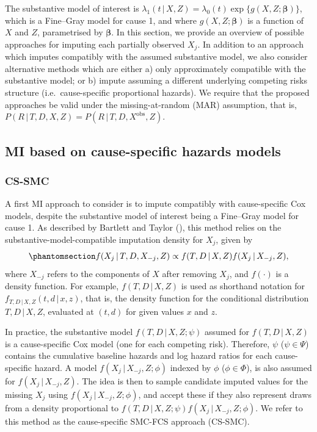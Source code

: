 \documentclass[
  letterpaper,
  paper=240mm:170mm,
  twoside=true,
  open=right,
  fontsize=10pt,
  pagesize=false,
  BCOR=15mm,
  DIV=14,
  headinclude=true,
  footinclude=false,
  headsepline=on]{scrbook}
\newcommand{\given}{\,|\,}
\begin{document}
The substantive model of interest is
\(\lambda_1(t \given X, Z) = \lambda_{0}(t)\exp\{g(X,Z;\boldsymbol{\beta})\}\),
which is a Fine--Gray model for cause 1, and where
\(g(X,Z;\boldsymbol{\beta})\) is a function of \(X\) and \(Z\),
parametrised by \(\boldsymbol{\beta}\). In this section, we provide an
overview of possible approaches for imputing each partially observed
\(X_j\). In addition to an approach which imputes compatibly with the
assumed substantive model, we also consider alternative methods which
are either a) only approximately compatible with the substantive model;
or b) impute assuming a different underlying competing risks structure
(i.e.~cause-specific proportional hazards). We require that the proposed
approaches be valid under the missing-at-random (MAR) assumption, that
is, \(P(R \given T, D, X, Z) = P(R \given T, D, X^{\text{obs}}, Z)\).

\subsection{MI based on cause-specific hazards
models}\label{mi-based-on-cause-specific-hazards-models}

\subsubsection{CS-SMC}\label{sec-cs-smc}

A first MI approach to consider is to impute compatibly with
cause-specific Cox models, despite the substantive model of interest
being a Fine--Gray model for cause 1. As described by Bartlett and
Taylor (),
this method relies on the substantive-model-compatible imputation
density for \(X_j\), given by
\begin{equation}\phantomsection\label{eq-imput-dens}{
f(X_j \given T, D, X_{-j}, Z) \propto f(T, D \given X, Z)f(X_j \given X_{-j},Z),
}\end{equation} where \(X_{-j}\) refers to the components of \(X\) after
removing \(X_j\), and \(f(\cdot)\) is a density function. For example,
\(f(T, D \given X, Z)\) is used as shorthand notation for
\(f_{T, D \given X, Z}(t, d \given x,z)\), that is, the density function
for the conditional distribution \(T, D \given X, Z\), evaluated at
\((t,d)\) for given values \(x\) and \(z\).

\sloppy In practice, the substantive model \(f(T, D \given X, Z;\psi)\)
assumed for \(f(T, D \given X, Z)\) is a cause-specific Cox model (one
for each competing risk). Therefore, \(\psi\) (\(\psi \in \Psi\))
contains the cumulative baseline hazards and log hazard ratios for each
cause-specific hazard. A model \(f(X_j \given X_{-j},Z;\phi)\) indexed
by \(\phi\) (\(\phi \in \Phi\)), is also assumed for
\(f(X_j \given X_{-j},Z)\). The idea is then to sample candidate imputed
values for the missing \(X_j\) using \(f(X_j \given X_{-j},Z;\phi)\),
and accept these if they also represent draws from a density
proportional to \(f(T, D \given X, Z;\psi)f(X_j \given X_{-j},Z;\phi)\).
We refer to this method as the cause-specific SMC-FCS approach (CS-SMC).
\end{document}
